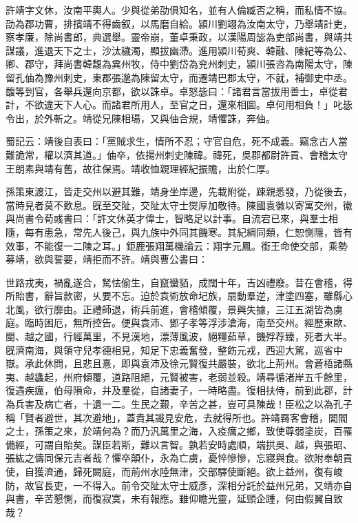 
\begin{pinyinscope}
許靖字文休，汝南平輿人。少與從弟劭俱知名，並有人倫臧否之稱，而私情不協。劭為郡功曹，排擯靖不得齒叙，以馬磨自給。潁川劉翊為汝南太守，乃舉靖計吏，察孝廉，除尚書郎，典選舉。靈帝崩，董卓秉政，以漢陽周毖為吏部尚書，與靖共謀議，進退天下之士，沙汰穢濁，顯拔幽滯。進用潁川荀爽、韓融、陳紀等為公、卿、郡守，拜尚書韓馥為兾州牧，侍中劉岱為兖州刺史，潁川張咨為南陽太守，陳留孔伷為豫州刺史，東郡張邈為陳留太守，而遷靖巴郡太守，不就，補御史中丞。馥等到官，各舉兵還向京都，欲以誅卓。卓怒毖曰：「諸君言當拔用善士，卓從君計，不欲違天下人心。而諸君所用人，至官之日，還來相圖。卓何用相負！」叱毖令出，於外斬之。靖從兄陳相瑒，又與伷合規，靖懼誅，奔伷。

蜀記云：靖後自表曰：「黨賊求生，情所不忍；守官自危，死不成義。竊念古人當難詭常，權以濟其道。」伷卒，依揚州刺史陳禕。禕死，吳郡都尉許貢、會稽太守王朗素與靖有舊，故往保焉。靖收恤親理經紀振贍，出於仁厚。

孫策東渡江，皆走交州以避其難，靖身坐岸邊，先載附從，踈親悉發，乃從後去，當時見者莫不歎息。旣至交阯，交阯太守士爕厚加敬待。陳國袁徽以寄寓交州，徽與尚書令荀彧書曰：「許文休英才偉士，智略足以計事。自流宕已來，與羣士相隨，每有患急，常先人後己，與九族中外同其饑寒。其紀綱同類，仁恕惻隱，皆有效事，不能復一二陳之耳。」鉅鹿張翔萬機論云：翔字元鳳。銜王命使交部，乘勢募靖，欲與誓要，靖拒而不許。靖與曹公書曰：

世路戎夷，禍亂遂合，駑怯偷生，自竄蠻貊，成闊十年，吉凶禮廢。昔在會稽，得所貽書，辭旨款密，乆要不忘。迫於袁術放命圮族，扇動羣逆，津塗四塞，雖縣心北風，欲行靡由。正禮師退，術兵前進，會稽傾覆，景興失據，三江五湖皆為虜庭。臨時困厄，無所控告。便與袁沛、鄧子孝等浮涉滄海，南至交州。經歷東歐、閩、越之國，行經萬里，不見漢地，漂薄風波，絕糧茹草，饑殍荐臻，死者大半。旣濟南海，與領守兒孝德相見，知足下忠義奮發，整飭元戎，西迎大駕，巡省中嶽。承此休問，且悲且憙，即與袁沛及徐元賢復共嚴裝，欲北上荊州。會蒼梧諸縣夷、越蠭起，州府傾覆，道路阻絕，元賢被害，老弱並殺。靖尋循渚岸五千餘里，復遇疾癘，伯母隕命，并及羣從，自諸妻子，一時略盡。復相扶侍，前到此郡，計為兵害及病亡者，十遺一二。生民之艱，辛苦之甚，豈可具陳哉！臣松之以為孔子稱「賢者避世，其次避地」，蓋貴其識見安危，去就得所也。許靖羇客會稽，閭閻之士，孫策之來，於靖何為？而乃汎萬里之海，入疫癘之鄉，致使尊弱塗炭，百罹備經，可謂自貽矣。謀臣若斯，難以言智。孰若安時處順，端拱吳、越，與張昭、張紘之儔同保元吉者哉？懼卒顛仆，永為亡虜，憂悴慘慘，忘寢與食。欲附奉朝貢使，自獲濟通，歸死闕庭，而荊州水陸無津，交部驛使斷絕。欲上益州，復有峻防，故官長吏，一不得入。前令交阯太守士威彥，深相分託於益州兄弟，又靖亦自與書，辛苦懇惻，而復寂寞，未有報應。雖仰瞻光靈，延頸企踵，何由假翼自致哉？


\end{pinyinscope}
